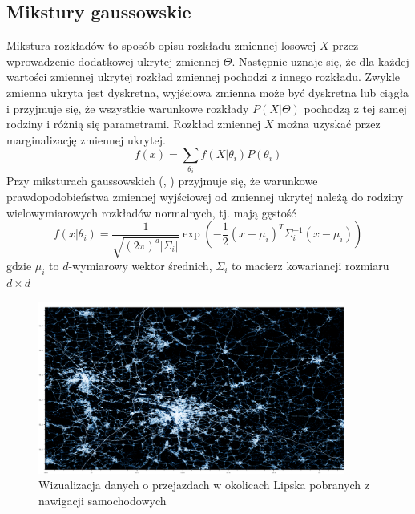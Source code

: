 \subsection{Mikstury gaussowskie}\label{sec:gmm}

Mikstura rozkładów to sposób opisu rozkładu zmiennej losowej $X$ przez wprowadzenie dodatkowej ukrytej zmiennej $\Theta$.
Następnie uznaje się, że dla każdej wartości zmiennej ukrytej rozkład zmiennej pochodzi z innego rozkładu.
Zwykle zmienna ukryta jest dyskretna, wyjściowa zmienna może być dyskretna lub ciągła i przyjmuje się, że wszystkie
warunkowe rozkłady $P(X|\Theta)$ pochodzą z tej samej rodziny i różnią się parametrami. Rozkład zmiennej $X$ można
uzyskać przez marginalizację zmiennej ukrytej.
$$f(x) = \sum_{\theta_i} f(X | \theta_i) P(\theta_i)$$
Przy miksturach gaussowskich (, ) przyjmuje się, że warunkowe prawdopodobieństwa zmiennej wyjściowej od zmiennej ukrytej
należą do rodziny wielowymiarowych rozkładów normalnych, tj. mają gęstość
$$f(x | \theta_i) = \frac{1}{\sqrt{(2 \pi)^d |\Sigma_i|}} \exp(-\frac{1}{2} (x - \mu_i)^T \Sigma_i^{-1} (x - \mu_i))$$
gdzie $\mu_i$ to $d$-wymiarowy wektor średnich, $\Sigma_i$ to macierz kowariancji rozmiaru $d \times d$

\begin{figure}[H]
    \centering
    \includegraphics[width=0.9\textwidth]{images/2_2_a_leipzig_datashader}
    \caption{Wizualizacja  danych o przejazdach w okolicach Lipska pobranych z nawigacji samochodowych}
    \label{fig:2_2_a_leipzig_datashader}
\end{figure}

